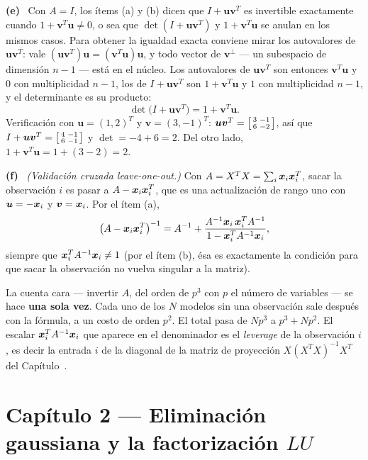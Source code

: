 \documentclass[11pt,a4paper]{article}
\makeatletter
\newcommand{\refnotas}[1]{\@ifundefined{r@#1}{\textup{[ver notas]}}{\ref{#1}}}
\newcommand{\bi}[1]{\boldsymbol{#1}}
\newcommand{\bu}{\bi{u}}  \newcommand{\bv}{\bi{v}}  \newcommand{\bw}{\bi{w}}
\newcounter{entrega}[section]
\newcommand{\itemsol}[1]{\par\medskip\noindent\textbf{(#1)}\ \ignorespaces}
\makeatother
\begin{document}
\itemsol{e} Con $A=I$, los ítems (a) y (b) dicen que $I+\bu\bv^T$ es invertible
exactamente cuando $1+\bv^T\bu\neq0$, o sea que $\det(I+\bu\bv^T)$ y
$1+\bv^T\bu$ se anulan en los mismos casos. Para obtener la igualdad exacta
conviene mirar los autovalores de $\bu\bv^T$: vale
$(\bu\bv^T)\bu=(\bv^T\bu)\bu$, y todo vector de $\bv^{\perp}$ --- un subespacio
de dimensión $n-1$ --- está en el núcleo. Los autovalores de $\bu\bv^T$ son
entonces $\bv^T\bu$ y $0$ con multiplicidad $n-1$, los de $I+\bu\bv^T$ son
$1+\bv^T\bu$ y $1$ con multiplicidad $n-1$, y el determinante es su producto:
\[
\det\big(I+\bu\bv^T\big)=1+\bv^T\bu .
\]
Verificación con $\bu=(1,2)^T$ y $\bv=(3,-1)^T$:
$\bu\bv^T=\begin{bsmallmatrix}3&-1\\6&-2\end{bsmallmatrix}$, así que
$I+\bu\bv^T=\begin{bsmallmatrix}4&-1\\6&-1\end{bsmallmatrix}$ y
$\det=-4+6=2$. Del otro lado, $1+\bv^T\bu=1+(3-2)=2$.

\itemsol{f} \emph{(Validación cruzada \textnormal{leave-one-out}.)} Con
$A=X^TX=\sum_i\bx_i\bx_i^T$, sacar la observación $i$ es pasar a
$A-\bx_i\bx_i^T$, que es una actualización de rango uno con $\bu=-\bx_i$ y
$\bv=\bx_i$. Por el ítem (a),
\[
\big(A-\bx_i\bx_i^T\big)^{-1}
=A^{-1}+\frac{A^{-1}\bx_i\,\bx_i^TA^{-1}}{1-\bx_i^TA^{-1}\bx_i},
\]
siempre que $\bx_i^TA^{-1}\bx_i\neq1$ (por el ítem (b), ésa es exactamente la
condición para que sacar la observación no vuelva singular a la matriz).

La cuenta cara --- invertir $A$, del orden de $p^3$ con $p$ el número de
variables --- se hace \textbf{una sola vez}. Cada uno de los $N$ modelos sin una
observación sale después con la fórmula, a un costo de orden $p^2$. El total
pasa de $N p^3$ a $p^3+Np^2$. El escalar $\bx_i^TA^{-1}\bx_i$ que aparece en el
denominador es el \emph{leverage} de la observación $i$, es decir la entrada $i$
de la diagonal de la matriz de proyección $X(X^TX)^{-1}X^T$ del
Capítulo~\refnotas{cap:ortogonalidad}.


\clearpage
\section{Capítulo 2 --- Eliminación gaussiana y la factorización $LU$}
\setcounter{entrega}{0}
\end{document}
